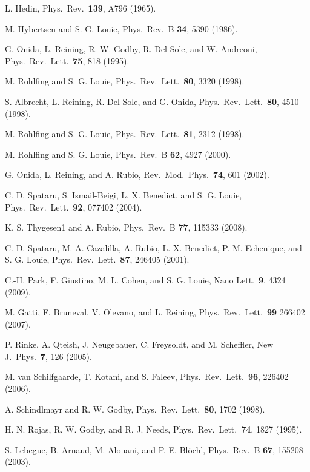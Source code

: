 \documentclass[twocolumn,prb,showpacs,superscriptaddress]{revtex4}
\begin{document}
\begin{thebibliography}{99}

L. Hedin,
Phys.\ Rev.\ {\bf 139}, A796 (1965).

M. Hybertsen and S. G. Louie,
Phys.\ Rev.\ B {\bf 34}, 5390 (1986).

G. Onida, L. Reining, R. W. Godby, R. Del Sole, and W. Andreoni, 
Phys.\ Rev.\ Lett.\ {\bf 75}, 818 (1995).

M. Rohlfing and S. G. Louie,
Phys.\ Rev.\ Lett.\ {\bf 80}, 3320 (1998).

S. Albrecht, L. Reining, R. Del Sole, and G. Onida, 
Phys.\ Rev.\ Lett.\ {\bf 80}, 4510 (1998).

M. Rohlfing and S. G. Louie,
Phys.\ Rev.\ Lett.\ {\bf 81}, 2312 (1998).

M. Rohlfing and S. G. Louie,
Phys.\ Rev.\ B {\bf 62}, 4927 (2000).

G. Onida, L. Reining, and A. Rubio,
Rev.\ Mod.\ Phys.\ {\bf 74}, 601 (2002).

C. D. Spataru, S. Ismail-Beigi, L. X. Benedict, and S. G. Louie,
Phys.\ Rev.\ Lett.\ {\bf 92}, 077402 (2004).

K. S. Thygesen1 and A. Rubio,
Phys.\ Rev.\ B {\bf 77}, 115333 (2008).

C. D. Spataru, M. A. Cazalilla, A. Rubio, L. X. Benedict, P. M. Echenique, and S. G. Louie,
Phys.\ Rev.\ Lett.\ {\bf 87}, 246405 (2001).

C.-H. Park, F. Giustino, M. L. Cohen, and S. G. Louie,
Nano Lett.\ {\bf 9}, 4324 (2009).

M. Gatti, F. Bruneval, V. Olevano, and L. Reining,
Phys.\ Rev.\ Lett.\ {\bf 99} 266402 (2007).

P. Rinke, A. Qteish, J. Neugebauer, C. Freysoldt, and M. Scheffler, 
New J.\ Phys.\ {\bf 7}, 126 (2005). 

M. van Schilfgaarde, T. Kotani, and S. Faleev,
Phys.\ Rev.\ Lett.\ {\bf 96}, 226402 (2006).

A. Schindlmayr and R. W. Godby,
Phys.\ Rev.\ Lett.\ {\bf 80}, 1702 (1998).

H. N. Rojas, R. W. Godby, and R. J. Needs,
Phys.\ Rev.\ Lett.\ {\bf 74}, 1827 (1995).

S. Lebegue, B. Arnaud, M. Alouani, and P. E. Bl\"ochl,
Phys.\ Rev.\ B {\bf 67}, 155208 (2003). 


\end{thebibliography}
\end{document}
